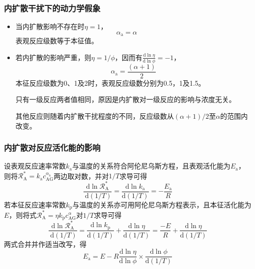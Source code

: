 \documentclass[dvipsnames, svgnames, x11names]{beamer}
\begin{document}
\begin{frame}
    \frametitle{内扩散干扰下的动力学假象}

    \begin{itemize}
        \item 当内扩散影响不存在时$\eta =1$，        
        \[
            \alpha_{\mathrm{a}}=\alpha \qquad
        \]
        表观反应级数等于本征值。
        \item 若内扩散的影响严重，则$\eta =1/\phi$，因而有$\frac{\mathrm{d} \ln \eta}{\mathrm{d} \ln \phi} = -1$，        
        \[
            \alpha_{\mathrm{a}}= \frac{(\alpha+1)}{2}
        \]        
        本征反应级数为0、1及2时，表观反应级数分别为0.5，1及1.5。

        只有一级反应两者值相同，原因是内扩散对一级反应的影响与浓度无关。
        
        其他反应则随着内扩散干扰程度的不同，反应级数从$(\alpha+1)/2$至$\alpha$的范围内改变。
    \end{itemize}

\end{frame}


\begin{frame}
    \frametitle{内扩散对反应活化能的影响}

    设表观反应速率常数$k_\mathrm{a}$与温度的关系符合阿伦尼乌斯方程，且表观活化能为$E_\mathrm{a}$，则将$\mathscr{R}_{\mathrm{A}}^{*}=k_{\mathrm{a}} c_{\mathrm{AG}}^{\alpha_\mathrm{a}}$两边取对数，并对$1/T$求导可得
    \[
        \frac{\mathrm{d} \ln \mathscr{R}_{\mathrm{A}}^{*}}{\mathrm{~d}(1 / T)}=\frac{\mathrm{d} \ln k_{\mathrm{a}}}{\mathrm{d}(1 / T)}=-\frac{E_{\mathrm{a}}}{R}
    \]
    若本征反应速率常数$k_\mathrm{p}$与温度的关系亦可用阿伦尼乌斯方程表示，且本征活化能为$E$，则将式$\mathscr{R}_{\mathrm{A}}^{*}=\eta k_{\mathrm{p}} c_{\mathrm{AG}}^\alpha$对$1/T$求导可得
    \[
        \frac{\mathrm{d} \ln \mathscr{R}_{\mathrm{A}}^{*}}{\mathrm{~d}(1 / T)}=\frac{\mathrm{d} \ln k_{\mathrm{p}}}{\mathrm{d}(1 / T)}+\frac{\mathrm{d} \ln \eta}{\mathrm{d}(1 / T)}=\frac{-E}{R}+\frac{\mathrm{d} \ln \eta}{\mathrm{d}(1 / T)}
    \]
    两式合并并作适当改写，得
    \[
        E_{\mathrm{a}}=E-R \frac{\mathrm{d} \ln \eta}{\mathrm{d} \ln \phi} \times \frac{\mathrm{d} \ln \phi}{\mathrm{d}(1 / T)}
    \]

\end{frame}
\end{document}
